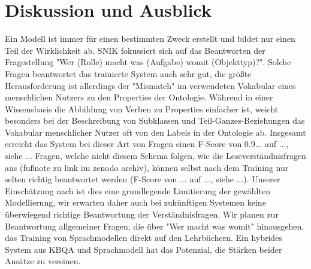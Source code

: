 \documentclass[utf8,biblatex]{lni}
\begin{document}
\section{Diskussion und Ausblick}

Ein Modell ist immer für einen bestimmten Zweck erstellt und bildet nur einen Teil der Wirklichkeit ab.
SNIK fokussiert sich auf das Beantworten der Fragestellung "Wer (Rolle) macht was (Aufgabe) womit (Objekttyp)?".
Solche Fragen beantwortet das trainierte System auch sehr gut, die größte Herausforderung ist allerdings der "Mismatch" im verwendeten Vokabular eines menschlichen Nutzers zu den Properties der Ontologie.
Während in einer Wissensbasis die Abbildung von Verben zu Properties einfacher ist, weicht besonders bei der Beschreibung von Subklassen und Teil-Ganzes-Beziehungen das Vokabular menschlicher Nutzer oft von den Labels in der Ontologie ab.
Insgesamt erreicht das System bei dieser Art von Fragen  einen F-Score von 0.9... auf ..., siehe ...
Fragen, welche nicht diesem Schema folgen, wie die Leseverständnisfragen aus \cite{bb} (fußnote zu link im zenodo archiv), können selbst nach dem Training nur selten richtig beantwortet werden (F-Score von ... auf ..., siehe ...).
Unserer Einschätzung nach ist dies eine grundlegende Limitierung der gewählten Modellierung, wir erwarten daher auch bei zukünftigen Systemen keine überwiegend richtige Beantwortung der Verständnisfragen.
Wir planen zur Beantwortung allgemeiner Fragen, die über "Wer macht was womit" hinausgehen, das Training von Sprachmodellen direkt auf den Lehrbüchern.
Ein hybrides System aus KBQA und Sprachmodell hat das Potenzial, die Stärken beider Ansätze zu vereinen.

\printbibliography
\end{document}
